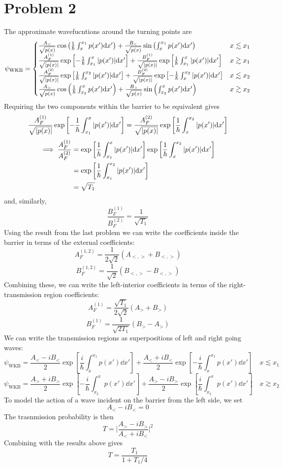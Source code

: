 \documentclass[12pt]{article}
\newcommand{\magsq}[1]{\big|#1\big|^2}
\newcommand{\cint}[2]{\int_{#1}^{#2}}
\begin{document}
\section*{Problem 2}
The approximate wavefucntions around the turning points are
\[ \psi_\text{WKB} = \begin{cases}
    \frac{A_<}{\sqrt{p(x)}}\cos\left(\frac{1}{\hbar}\cint{x}{x_1}p(x')\dd x'\right) + \frac{B_<}{\sqrt{p(x)}}\sin\left(\cint{x}{x_1}p(x')\dd x'\right) & x \lesssim x_1 \\
    \frac{A_F^{(1)}}{\sqrt{\abs{p(x)}}}\exp\left[-\frac{1}{\hbar}\cint{x_1}{x}\abs{p(x')}\dd x'\right] + \frac{B_F^{(1)}}{\sqrt{\abs{p(x)}}}\exp\left[\frac{1}{\hbar}\cint{x_1}{x}\abs{p(x')}\dd x'\right] & x \gtrsim x_1 \\
    \frac{A_F^{(2)}}{\sqrt{\abs{p(x)}}}\exp\left[\frac{1}{\hbar}\cint{x}{x_2}\abs{p(x')}\dd x'\right] + \frac{B_F^{(2)}}{\sqrt{\abs{p(x)}}}\exp\left[-\frac{1}{\hbar}\cint{x}{x_2}\abs{p(x')}\dd x'\right] & x \lesssim x_2 \\
    \frac{A_>}{\sqrt{p(x)}}\cos\left(\frac{1}{\hbar}\cint{x_2}{x}p(x')\dd x'\right) + \frac{B_>}{\sqrt{p(x)}}\sin\left(\cint{x_2}{x}p(x')\dd x'\right) & x \gtrsim x_2
\end{cases} \]
Requiring the two components within the barrier to be equivalent gives
\[ \frac{A_F^{(1)}}{\sqrt{\abs{p(x)}}}\exp\left[-\frac{1}{\hbar}\cint{x_1}{x}\abs{p(x')}\dd x'\right] = \frac{A_F^{(2)}}{\sqrt{\abs{p(x)}}}\exp\left[\frac{1}{\hbar}\cint{x}{x_2}\abs{p(x')}\dd x'\right] \]
\begin{align*}
    \implies \frac{A_F^{(1)}}{A_F^{(2)}} & = \exp\left[\frac{1}{\hbar}\cint{x_1}{x}\abs{p(x')}\dd x'\right]\exp\left[\frac{1}{\hbar}\cint{x}{x_2}\abs{p(x')}\dd x'\right] \\
    & = \exp\left[\frac{1}{\hbar}\cint{x_1}{x_2}\abs{p(x')}\dd x'\right] \\
    & = \sqrt{T_1}
\end{align*}
and, similarly,
\[ \frac{B_F^{(1)}}{B_F^{(2)}} = \frac{1}{\sqrt{T_1}} \]
Using the result from the last problem we can write the coefficients inside the barrier in terms of the external coefficients:
\[ A_F^{(1,2)} = \frac{1}{2\sqrt{2}}(A_{<,>} + B_{<,>}) \]
\[ B_F^{(1,2)} = \frac{1}{\sqrt{2}}(B_{<,>} - B_{<,>}) \]
Combining these, we can write the left-interior coefficients in terms of the right-transmission region coefficients:
\[ A_F^{(1)} = \frac{\sqrt{T_1}}{2\sqrt{2}}(A_> + B_>) \]
\[ B_F^{(1)} = \frac{1}{\sqrt{2T_1}}(B_> - A_>) \]
We can write the transmission regions as superpositions of left and right going waves:
\[ \psi_\text{WKB} = \frac{A_< - iB_<}{2}\exp\left[\frac{i}{\hbar}\cint{x}{x_1}p(x')\dd x'\right] + \frac{A_< + iB_<}{2}\exp\left[-\frac{i}{\hbar}\cint{x}{x_1}p(x')\dd x'\right] \quad x \lesssim x_1  \]
\[ \psi_\text{WKB} = \frac{A_> + iB_>}{2}\exp\left[-\frac{i}{\hbar}\cint{x_2}{x}p(x')\dd x'\right] + \frac{A_> - iB_>}{2}\exp\left[\frac{i}{\hbar}\cint{x_2}{x}p(x')\dd x'\right] \quad x \gtrsim x_2  \]
To model the action of a wave incident on the barrier from the left side, we set
\[ A_< - iB_< = 0 \]
The trasnmission probability is then
\[ T = \magsq{\frac{A_> - iB_>}{A_< + iB_<}} \]
Combining with the results above gives
\[ T = \frac{T_1}{1 + T_1/4} \]
\end{document}
